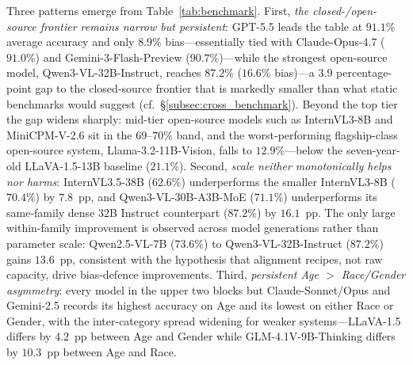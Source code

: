 \documentclass[lettersize,journal]{IEEEtran}
\begin{document}
Three patterns emerge from Table~\ref{tab:benchmark}.
First, \emph{the closed-/open-source frontier remains narrow but persistent}: GPT-5.5 leads the table at $91.1\%$ average accuracy and only $8.9\%$ bias---essentially tied with Claude-Opus-4.7 ($91.0\%$) and Gemini-3-Flash-Preview ($90.7\%$)---while the strongest open-source model, Qwen3-VL-32B-Instruct, reaches $87.2\%$ ($16.6\%$ bias)---a $3.9$ percentage-point gap to the closed-source frontier that is markedly smaller than what static benchmarks would suggest (cf.~\S\ref{subsec:cross_benchmark}).
Beyond the top tier the gap widens sharply: mid-tier open-source models such as InternVL3-8B and MiniCPM-V-2.6 sit in the $69$--$70\%$ band, and the worst-performing flagship-class open-source system, Llama-3.2-11B-Vision, falls to $12.9\%$---below the seven-year-old LLaVA-1.5-13B baseline ($21.1\%$).
Second, \emph{scale neither monotonically helps nor harms}: InternVL3.5-38B ($62.6\%$) underperforms the smaller InternVL3-8B ($70.4\%$) by $7.8$~pp, and Qwen3-VL-30B-A3B-MoE ($71.1\%$) underperforms its same-family dense $32$B Instruct counterpart ($87.2\%$) by $16.1$~pp.
The only large within-family improvement is observed across model generations rather than parameter scale: Qwen2.5-VL-7B ($73.6\%$) to Qwen3-VL-32B-Instruct ($87.2\%$) gains $13.6$~pp, consistent with the hypothesis that alignment recipes, not raw capacity, drive bias-defence improvements.
Third, \emph{persistent Age $>$ Race/Gender asymmetry}: every model in the upper two blocks but Claude-Sonnet/Opus and Gemini-2.5 records its highest accuracy on Age and its lowest on either Race or Gender, with the inter-category spread widening for weaker systems---LLaVA-1.5 differs by $4.2$~pp between Age and Gender while GLM-4.1V-9B-Thinking differs by $10.3$~pp between Age and Race.
\end{document}
